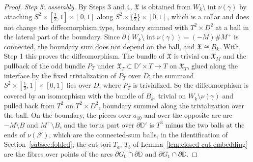 \documentclass[11pt]{amsart}
\theoremstyle{definition}
\theoremstyle{remark}
\theoremstyle{plain}
\numberwithin{equation}{section}
\begin{document}
\begin{proof}
\emph{Step 5: assembly.} By Steps 3 and 4, $\mathfrak X$ is obtained from
$W_k\setminus\operatorname{int}\nu(\gamma)$ by attaching $S^2\times[\tfrac12,1]\times[0,1]$ along
$S^2\times\{\tfrac12\}\times[0,1]$, which is a collar and does not change the diffeomorphism
type, boundary summed with $T^2\times D^2$ at a ball in the lateral part of the
boundary. Since $\partial(W_k\setminus\operatorname{int}\nu(\gamma))=(-M)\#M^+$ is connected, the boundary
sum does not depend on the ball, and $\mathfrak X\cong B_k$. With Step 1 this proves the
diffeomorphism. The bundle of $\mathfrak X$ is trivial on $\mathfrak X_M$ and the pullback of
the odd bundle $P_T$ under $\mathfrak X_T\subset\mathbb D'\times T\to T$ on $\mathfrak X_T$, glued along the interface
by the fixed trivialization of $P_T$ over $D$; the summand $S^2\times[\tfrac12,1]\times[0,1]$ lies
over $D$, where $P_T$ is trivialized. So the diffeomorphism is covered by an
isomorphism with the bundle of $B_k$, trivial on $W_k\setminus\nu(\gamma)$ and pulled back
from $T^2$ on $T^2\times D^2$, boundary summed along the trivialization over the ball.
On the boundary, the pieces over $a_{10}$ and over the opposite arc are
$-M\setminus B$ and $M^+\setminus B$, and the torus part over $\partial\mathbb D'$ is $T^3$ minus the two
balls at the ends of $\nu(\beta')$, which are the connected-sum balls, in the
identification of Section~\ref{subsec:folded}; the cut tori $T_a$, $T_b$ of
Lemma~\ref{lem:closed-cut-embedding} are the fibres over points of the arcs
$\partial G_0\cap\partial\mathbb D$ and $\partial G_1\cap\partial\mathbb D$.


\end{proof}
\end{document}
